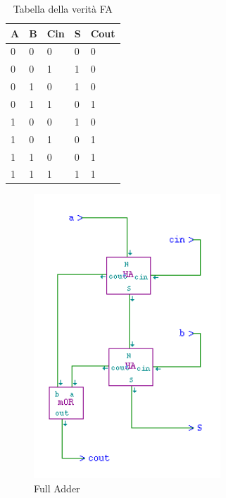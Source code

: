 \documentclass[10pt]{article}
\begin{document}
\begin{itemize}
\begin{table}[H]
    \begin{minipage}[b]{\textwidth}
    \centering
    \begin{tabular}{|l|l|l|l|l|}
        \hline
        \textbf{A} & \textbf{B} & \textbf{Cin} & \textbf{S} & \textbf{Cout} \\ \hline
        0          & 0          & 0            & 0          & 0             \\ 
        0          & 0          & 1            & 1          & 0             \\ 
        0          & 1          & 0            & 1          & 0             \\ 
        0          & 1          & 1            & 0          & 1             \\ 
        1          & 0          & 0            & 1          & 0             \\ 
        1          & 0          & 1            & 0          & 1             \\ 
        1          & 1          & 0            & 0          & 1             \\ 
        1          & 1          & 1            & 1          & 1             \\ \hline
        \end{tabular}
        \caption{Tabella della verità FA}
        \label{table:student}
    \end{minipage}
    \end{table}
    
    \begin{figure}[H]
    \begin{minipage}[b]{\textwidth}
    \centering
    \includegraphics[width=70mm]{FA}
    \caption{Full Adder}
    \label{ }
    \end{minipage}
    \end{figure}


\end{itemize}
\end{document}
